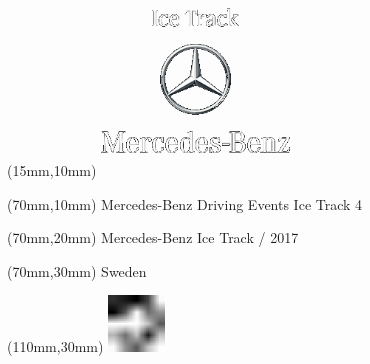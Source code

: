 \null\newpage
\begin{textblock*}{50mm}(15mm,10mm)%
\includegraphics[width=50mm]{LG/MER.png}
\end{textblock*}
\begin{textblock*}{130mm}(70mm,10mm)%
{\fontsize{20}{20}\selectfont Mercedes-Benz Driving Events Ice Track 4}\\
\end{textblock*}
\begin{textblock*}{120mm}(70mm,20mm)%
{\fontsize{16}{16}\selectfont Mercedes-Benz Ice Track / 2017}\\
\end{textblock*}
\begin{textblock*}{120mm}(70mm,30mm)%
{\fontsize{12}{12}\selectfont Sweden}
\end{textblock*}
\begin{textblock*}{30mm}(110mm,30mm)%
\centering
\includegraphics[height=15mm]{icons/fa-rotate-left.pdf}
\end{textblock*}
